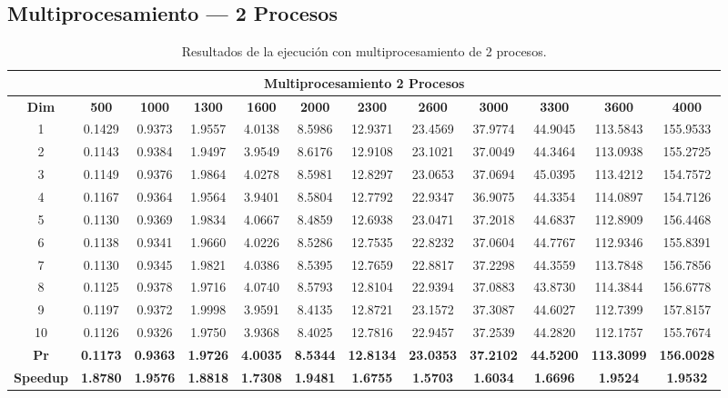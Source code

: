 \documentclass{article}
\begin{document}

\subsection{Multiprocesamiento --- 2 Procesos}

\begin{table}[H]
\centering
\tiny
\begin{tabular}{|c|c|c|c|c|c|c|c|c|c|c|c|}
\hline
\multicolumn{12}{|c|}{\textbf{Multiprocesamiento 2 Procesos}} \\
\hline
\textbf{Dim} & \textbf{500} & \textbf{1000} & \textbf{1300} & \textbf{1600} & \textbf{2000} & \textbf{2300} & \textbf{2600} & \textbf{3000} & \textbf{3300} & \textbf{3600} & \textbf{4000} \\
\hline
1  & 0.1429 & 0.9373 & 1.9557 & 4.0138 & 8.5986 & 12.9371 & 23.4569 & 37.9774 & 44.9045 & 113.5843 & 155.9533 \\
2  & 0.1143 & 0.9384 & 1.9497 & 3.9549 & 8.6176 & 12.9108 & 23.1021 & 37.0049 & 44.3464 & 113.0938 & 155.2725 \\
3  & 0.1149 & 0.9376 & 1.9864 & 4.0278 & 8.5981 & 12.8297 & 23.0653 & 37.0694 & 45.0395 & 113.4212 & 154.7572 \\
4  & 0.1167 & 0.9364 & 1.9564 & 3.9401 & 8.5804 & 12.7792 & 22.9347 & 36.9075 & 44.3354 & 114.0897 & 154.7126 \\
5  & 0.1130 & 0.9369 & 1.9834 & 4.0667 & 8.4859 & 12.6938 & 23.0471 & 37.2018 & 44.6837 & 112.8909 & 156.4468 \\
6  & 0.1138 & 0.9341 & 1.9660 & 4.0226 & 8.5286 & 12.7535 & 22.8232 & 37.0604 & 44.7767 & 112.9346 & 155.8391 \\
7  & 0.1130 & 0.9345 & 1.9821 & 4.0386 & 8.5395 & 12.7659 & 22.8817 & 37.2298 & 44.3559 & 113.7848 & 156.7856 \\
8  & 0.1125 & 0.9378 & 1.9716 & 4.0740 & 8.5793 & 12.8104 & 22.9394 & 37.0883 & 43.8730 & 114.3844 & 156.6778 \\
9  & 0.1197 & 0.9372 & 1.9998 & 3.9591 & 8.4135 & 12.8721 & 23.1572 & 37.3087 & 44.6027 & 112.7399 & 157.8157 \\
10 & 0.1126 & 0.9326 & 1.9750 & 3.9368 & 8.4025 & 12.7816 & 22.9457 & 37.2539 & 44.2820 & 112.1757 & 155.7674 \\
\hline
\textbf{Pr} & \textbf{0.1173} & \textbf{0.9363} & \textbf{1.9726} & \textbf{4.0035} & \textbf{8.5344} & \textbf{12.8134} & \textbf{23.0353} & \textbf{37.2102} & \textbf{44.5200} & \textbf{113.3099} & \textbf{156.0028} \\
\hline
\textbf{Speedup} & \textbf{1.8780} & \textbf{1.9576} & \textbf{1.8818} & \textbf{1.7308} & \textbf{1.9481} & \textbf{1.6755} & \textbf{1.5703} & \textbf{1.6034} & \textbf{1.6696} & \textbf{1.9524} & \textbf{1.9532} \\
\hline
\end{tabular}
\caption{Resultados de la ejecución con multiprocesamiento de 2 procesos.}
\label{tab:mp2}
\end{table}
\end{document}
